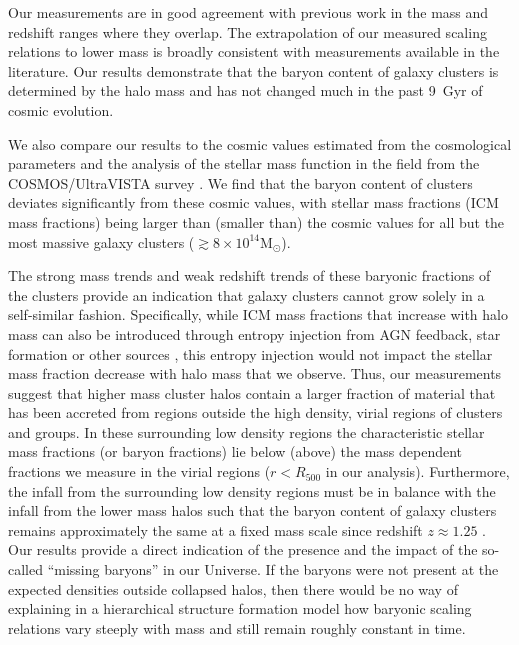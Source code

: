 \documentclass[useAMS,usenatbib,iop,numberedappendix]{mn2e}
\newcommand{\Msun}{\ensuremath{\mathrm{M}_{\odot}}}
\newcommand{\Rfiveoo}{\ensuremath{R_{500}}}
\newcommand{\redshift}{\ensuremath{z}}
\begin{document}
Our measurements are in good agreement with previous work in the mass and redshift ranges where they overlap.  
The extrapolation of our measured scaling relations to lower mass is broadly consistent with measurements available in the literature.  Our results demonstrate that the baryon content of galaxy clusters is determined by the halo mass and has not changed much in the past 9~Gyr of cosmic evolution.

We also compare our results to the cosmic values estimated from the cosmological parameters \citep{planck16cosmological} and the analysis of the stellar mass function in the field from the COSMOS/UltraVISTA survey \citep{muzzin13}.
We find that the baryon content of clusters deviates significantly from these cosmic values, with stellar mass fractions (ICM mass fractions) being larger than (smaller than) the cosmic values for all but the most massive galaxy clusters ($\gtrsim8\times10^{14}\Msun$).

The strong mass trends and weak redshift trends of these baryonic fractions of the clusters provide an indication that galaxy clusters cannot grow solely in a self-similar fashion.  Specifically, while ICM mass fractions that increase with halo mass can also be introduced through entropy injection from AGN feedback, star formation or other sources \citep[e.g.][]{ponman99}, this entropy injection would not impact the stellar mass fraction decrease with halo mass that we observe.  Thus, our measurements suggest that higher mass cluster halos contain a larger fraction of material that has been accreted from regions outside the high density, virial regions of clusters and groups.  In these surrounding low density regions the  characteristic stellar mass fractions (or baryon fractions) lie below (above) the mass dependent fractions we measure in the virial regions ($r<\Rfiveoo$ in our analysis).  Furthermore, the infall from the surrounding low density regions must be in balance with the infall from the lower mass halos such that the baryon content of galaxy clusters remains approximately the same at a fixed mass scale since redshift $\redshift\approx1.25$ \citep{chiu16a}.  Our results provide a direct indication of the presence and the impact of the so-called ``missing baryons'' in our Universe.  If the baryons were not present at the expected densities outside collapsed halos, then there would be no way of explaining in a hierarchical structure formation model how baryonic scaling relations vary steeply with mass and still remain roughly constant in time.
\end{document}
